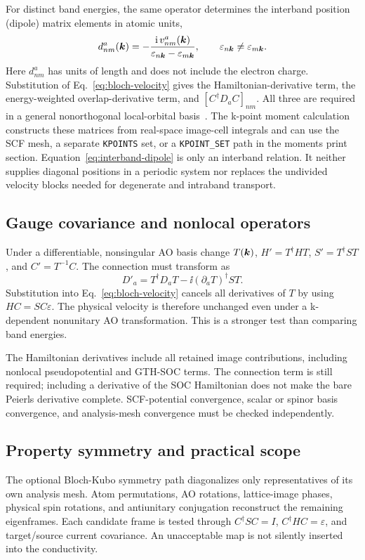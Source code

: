 For distinct band energies, the same operator determines the interband
position (dipole) matrix elements in atomic units,
\begin{equation}
 d^a_{nm}(\bm{k})
 =-\frac{\mathrm{i}\,v^a_{nm}(\bm{k})}
 {\varepsilon_{n\bm{k}}-\varepsilon_{m\bm{k}}},
 \qquad \varepsilon_{n\bm{k}}\ne\varepsilon_{m\bm{k}}.
 \label{eq:interband-dipole}
\end{equation}
Here $d^a_{nm}$ has units of length and does not include the electron
charge. Substitution of Eq.~\eqref{eq:bloch-velocity} gives the
Hamiltonian-derivative term, the energy-weighted overlap-derivative term,
and $[C^\dagger D_a C]_{nm}$. All three are required in a general
nonorthogonal local-orbital basis~\cite{EsteveParedes2023}.
The k-point moment calculation constructs these matrices from real-space
image-cell integrals and can use the SCF mesh, a separate \texttt{KPOINTS}
set, or a \texttt{KPOINT\_SET} path in the moments print section.
Equation~\eqref{eq:interband-dipole} is only an interband relation.
It neither supplies diagonal positions in a periodic system nor replaces
the undivided velocity blocks needed for degenerate and intraband
transport.

\subsection{Gauge covariance and nonlocal operators}
Under a differentiable, nonsingular AO basis change $T(\bm{k})$,
$H'=T^\dagger HT$, $S'=T^\dagger ST$, and $C'=T^{-1}C$.
The connection must transform as
\begin{equation}
 D'_a=T^\dagger D_aT-\ii(\partial_aT)^\dagger ST .
 \label{eq:connection-transform}
\end{equation}
Substitution into Eq.~\eqref{eq:bloch-velocity} cancels all derivatives
of $T$ by using $HC=SC\varepsilon$.
The physical velocity is therefore unchanged even under a
k-dependent nonunitary AO transformation.
This is a stronger test than comparing band energies.

The Hamiltonian derivatives include all retained image contributions,
including nonlocal pseudopotential and GTH-SOC terms.
The connection term is still required; including a derivative of the
SOC Hamiltonian does not make the bare Peierls derivative complete.
SCF-potential convergence, scalar or spinor basis convergence, and
analysis-mesh convergence must be checked independently.

\subsection{Property symmetry and practical scope}
The optional Bloch-Kubo symmetry path diagonalizes only representatives
of its own analysis mesh. Atom permutations, AO rotations, lattice-image
phases, physical spin rotations, and antiunitary conjugation reconstruct
the remaining eigenframes. Each candidate frame is tested through
$C^\dagger SC=I$, $C^\dagger HC=\varepsilon$, and target/source current
covariance. An unacceptable map is not silently inserted into the
conductivity.

